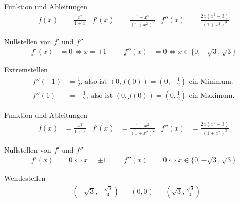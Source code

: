 \begin{taskframes}{3.108}
\begin{taskframe}
    \begin{mathbox}{Funktion und Ableitungen}
        \begin{align*}
            f(x) &= \frac{x^2}{1+x} & f'(x) &= \frac{1 - x^2}{(1+x^2)^2} & f''(x) &= \frac{2x(x^2-3)}{(1+x^2)^3}
        \end{align*}
    \end{mathbox}
    \begin{mathbox}{Nullstellen von $f'$ und $f''$}
        \begin{align*}
            f'(x) &= 0 \Leftrightarrow x = \pm 1 & &&
            f''(x) &= 0 \Leftrightarrow x \in \{0,-\sqrt{3}, \sqrt{3}\}
        \end{align*}
    \end{mathbox}
    \begin{mathbox}{Extremstellen}
        \begin{align*}
            f''(-1) &= \frac{1}{2} \text{, also ist $(0,f(0)) = (0,-\frac{1}{2})$ ein Minimum.} \\
            f''(1) &= -\frac{1}{2} \text{, also ist $(0,f(0)) = (0,\frac{1}{2})$ ein Maximum.}
        \end{align*}
    \end{mathbox}
\end{taskframe}

\begin{taskframe}
    \begin{mathbox}{Funktion und Ableitungen}
        \begin{align*}
            f(x) &= \frac{x^2}{1+x} & f'(x) &= \frac{1 - x^2}{(1+x^2)^2} & f''(x) &= \frac{2x(x^2-3)}{(1+x^2)^3}
        \end{align*}
    \end{mathbox}
    \begin{mathbox}{Nullstellen von $f'$ und $f''$}
        \begin{align*}
            f'(x) &= 0 \Leftrightarrow x = \pm 1 & &&
            f''(x) &= 0 \Leftrightarrow x \in \{0,-\sqrt{3}, \sqrt{3}\}
        \end{align*}
    \end{mathbox}
    \begin{mathbox}{Wendestellen}
        \begin{align*}
            &(-\sqrt{3}, -\frac{\sqrt{3}}{4}) & &(0,0) & &(\sqrt{3}, \frac{\sqrt{3}}{4})
        \end{align*}
    \end{mathbox}
\end{taskframe}

\end{taskframes}
